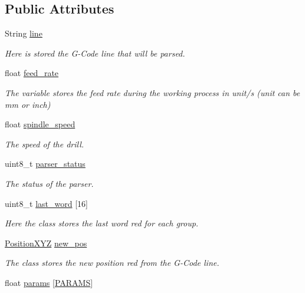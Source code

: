 \subsection*{Public Attributes}
\begin{DoxyCompactItemize}
\item 
String \hyperlink{class_g_code_a20d7c90740e9e139b24f68336ad8c8f1}{line}
\begin{DoxyCompactList}\small\item\em Here is stored the G-\/\+Code line that will be parsed. \end{DoxyCompactList}\item 
float \hyperlink{class_g_code_a0115efce11fdffa2c59304706ecacede}{feed\+\_\+rate}
\begin{DoxyCompactList}\small\item\em The variable stores the feed rate during the working process in unit/s (unit can be mm or inch) \end{DoxyCompactList}\item 
float \hyperlink{class_g_code_a03613c115ef107290355c78384ebee27}{spindle\+\_\+speed}
\begin{DoxyCompactList}\small\item\em The speed of the drill. \end{DoxyCompactList}\item 
uint8\+\_\+t \hyperlink{class_g_code_a56d0e5e56115cd8e7b3f161cc8c0528e}{parser\+\_\+status}
\begin{DoxyCompactList}\small\item\em The status of the parser. \end{DoxyCompactList}\item 
uint8\+\_\+t \hyperlink{class_g_code_a3674417ee3c5141c6655c05f6ffa0799}{last\+\_\+word} \mbox{[}16\mbox{]}
\begin{DoxyCompactList}\small\item\em Here the class stores the last word red for each group. \end{DoxyCompactList}\item 
\hyperlink{class_position_x_y_z}{Position\+X\+Y\+Z} \hyperlink{class_g_code_aadec9af8923a5dc95f9f7da8bccfc109}{new\+\_\+pos}
\begin{DoxyCompactList}\small\item\em The class stores the new position red from the G-\/\+Code line. \end{DoxyCompactList}\item 
float \hyperlink{class_g_code_a6f38c9dddbd7c12c786c6363fd2a369c}{params} \mbox{[}\hyperlink{_g_code__def_8h_ab0b1e59d96396ba9dca2147f9feb44eb}{P\+A\+R\+A\+M\+S}\mbox{]}

\end{DoxyCompactItemize}
